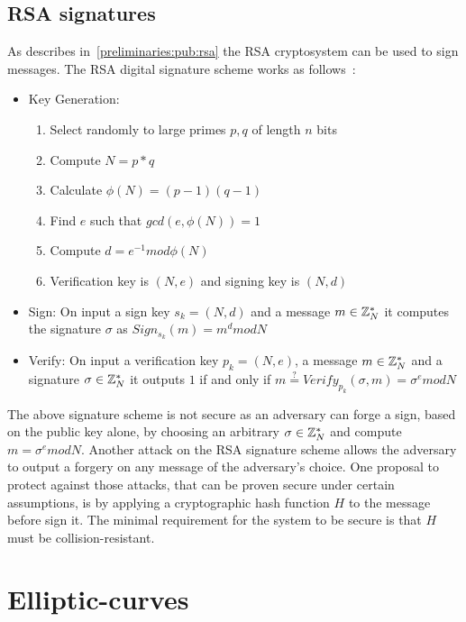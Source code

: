 \subsection{RSA signatures}
\label{preliminaries:sign:rsa}

As describes in~\ref{preliminaries:pub:rsa} the RSA cryptosystem can be used to sign messages. The RSA digital signature scheme works as follows~\cite{Katz:2014:IMC:2700550, kiagias:crypto}:

\begin{itemize}
  \item Key Generation:
    \begin{enumerate}
      \item Select randomly to large primes $p, q$ of length $n$ bits
      \item Compute $N = p*q$
      \item Calculate $\phi(N) = (p - 1)(q - 1)$
      \item Find $e$ such that $gcd(e, \phi(N)) = 1$
      \item Compute $d = e^{-1} mod\phi(N)$
      \item Verification key is $(N, e)$ and signing key is $(N, d)$
    \end{enumerate}
  \item Sign: On input a sign key $s_k = (N, d)$ and a message $m \in \mathbb{Z}^{*}_{N}$ it computes the signature $\sigma$ as $ Sign_{s_k}(m) = m^{d}modN$
  \item Verify: On input a verification key $p_k = (N, e)$, a message $m \in \mathbb{Z}^{*}_{N}$ and a signature $\sigma \in \mathbb{Z}^{*}_{N}$ it outputs $1$ if and only if $m \stackrel{?}{=} Verify_{p_k}(\sigma, m) = \sigma^{e}modN$
\end{itemize}

The above signature scheme is not secure as an adversary can forge a sign, based on the public key alone, by choosing an arbitrary $\sigma \in \mathbb{Z}^{*}_{N}$ and compute $m = \sigma^{e}modN$. Another attack on the RSA signature scheme allows the adversary to output a forgery on any message of the adversary's choice. One proposal to protect against those attacks, that can be proven secure under certain assumptions, is by applying a cryptographic hash function $H$ to the message before sign it. The minimal requirement for the system to be secure is that $H$ must be collision-resistant.

\section{Elliptic-curves}
\label{preliminaries:el_curves}

